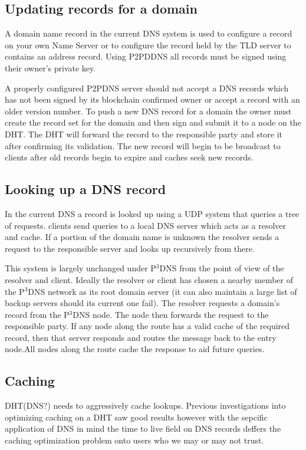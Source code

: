 \documentclass[11pt]{IEEEtran} %
\begin{document}
\subsection{Updating records for a domain}
A domain name record in the current DNS system is used to configure a record on your own Name Server or to configure the record held by the TLD server to contains an address record. Using P2PDDNS all records must be signed using their owner's private key. 

A properly configured P2PDNS server should not accept a DNS records which has not been signed by its blockchain confirmed owner or accept a record with an older version number. To push a new DNS record for a domain the owner must create the record set for the domain and then sign and submit it to a node on the DHT. The DHT will forward the record to the responsible party and store it after confirming its validation. The new record will begin to be broadcast to clients after old records begin to expire and caches seek new records.

\subsection{Looking up a DNS record}
In the current DNS a record is looked up using a UDP system that queries a tree of requests. clients send queries to a local DNS server which acts as a resolver and cache. If a portion of the domain name is unknown the resolver sends a request to the responsible server and looks up recursively from there.

This system is largely unchanged under P$^{3}$DNS from the point of view of the resolver and client. Ideally the resolver or client has chosen a nearby member of the P$^{3}$DNS network as its root domain server (it can also maintain a large list of backup servers should its current one fail). The resolver requests a domain’s record from the P$^{3}$DNS node. The node then forwards the request to the responsible party. If any node along the route has a valid cache of the required record, then that server responds and routes the message back to the entry node.All nodes along the route cache the response to aid future queries.

\subsection{Caching}
DHT(DNS?) needs to aggressively cache lookups. Previous investigations into optimizing caching on a DHT saw good results \cite{irm} however with the sepcific application of DNS in mind the time to live field on DNS records deffers the caching optimization problem onto users who we may or may not trust.
\end{document}
